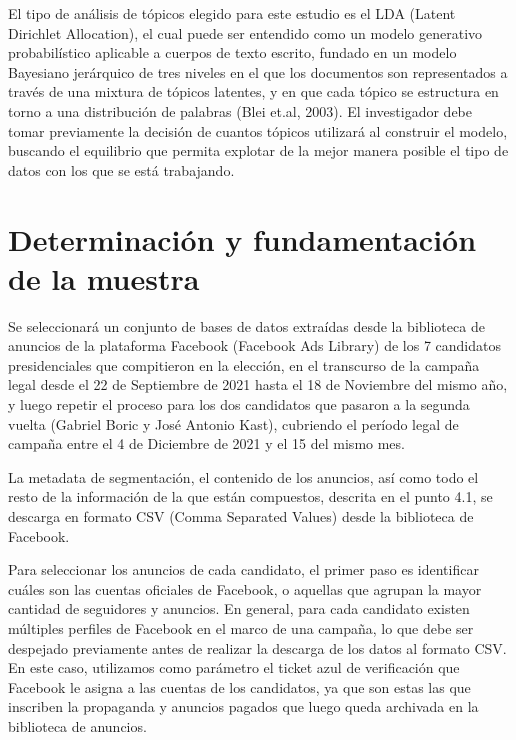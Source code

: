 \documentclass[
  10pt,
  letterpaper,
]{report}
\begin{document}
El tipo de análisis de tópicos elegido para este estudio es el LDA
(Latent Dirichlet Allocation), el cual puede ser entendido como un
modelo generativo probabilístico aplicable a cuerpos de texto escrito,
fundado en un modelo Bayesiano jerárquico de tres niveles en el que los
documentos son representados a través de una mixtura de tópicos
latentes, y en que cada tópico se estructura en torno a una distribución
de palabras (Blei et.al, 2003). El investigador debe tomar previamente
la decisión de cuantos tópicos utilizará al construir el modelo,
buscando el equilibrio que permita explotar de la mejor manera posible
el tipo de datos con los que se está trabajando.

\hypertarget{determinaciuxf3n-y-fundamentaciuxf3n-de-la-muestra}{%
\section{Determinación y fundamentación de la
muestra}\label{determinaciuxf3n-y-fundamentaciuxf3n-de-la-muestra}}

Se seleccionará un conjunto de bases de datos extraídas desde la
biblioteca de anuncios de la plataforma Facebook (Facebook Ads Library)
de los 7 candidatos presidenciales que compitieron en la elección, en el
transcurso de la campaña legal desde el 22 de Septiembre de 2021 hasta
el 18 de Noviembre del mismo año, y luego repetir el proceso para los
dos candidatos que pasaron a la segunda vuelta (Gabriel Boric y José
Antonio Kast), cubriendo el período legal de campaña entre el 4 de
Diciembre de 2021 y el 15 del mismo mes.

La metadata de segmentación, el contenido de los anuncios, así como todo
el resto de la información de la que están compuestos, descrita en el
punto 4.1, se descarga en formato CSV (Comma Separated Values) desde la
biblioteca de Facebook.

Para seleccionar los anuncios de cada candidato, el primer paso es
identificar cuáles son las cuentas oficiales de Facebook, o aquellas que
agrupan la mayor cantidad de seguidores y anuncios. En general, para
cada candidato existen múltiples perfiles de Facebook en el marco de una
campaña, lo que debe ser despejado previamente antes de realizar la
descarga de los datos al formato CSV. En este caso, utilizamos como
parámetro el ticket azul de verificación que Facebook le asigna a las
cuentas de los candidatos, ya que son estas las que inscriben la
propaganda y anuncios pagados que luego queda archivada en la biblioteca
de anuncios.
\end{document}
